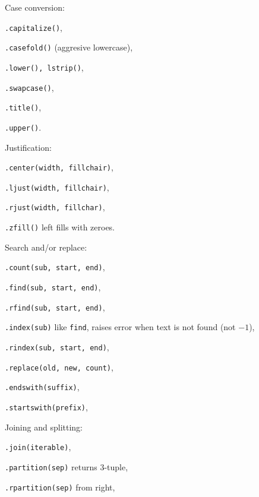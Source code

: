 \begin{compactenum}
\item Case conversion:
\begin{compactenum}
\item \texttt{.capitalize()},
\item \texttt{.casefold()} (aggresive lowercase),
\item \texttt{.lower(), lstrip()},
\item \texttt{.swapcase()},
\item \texttt{.title()},
\item \texttt{.upper()}.
\end{compactenum}
\item Justification:
\begin{compactenum}
\item \texttt{.center(width, fillchair)},
\item \texttt{.ljust(width, fillchair)},
\item \texttt{.rjust(width, fillchar)},
\item \texttt{.zfill()} left fills with zeroes.
\end{compactenum}
\item Search and/or replace:
\begin{compactenum}
\item \texttt{.count(sub, start, end)},
\item \texttt{.find(sub, start, end)},
\item \texttt{.rfind(sub, start, end)},
\item \texttt{.index(sub)} like \texttt{find}, raises error when text is not found (not $-1$),
\item \texttt{.rindex(sub, start, end)},
\item \texttt{.replace(old, new, count)},
\item \texttt{.endswith(suffix)},
\item \texttt{.startswith(prefix)},
\end{compactenum}
\item Joining and splitting:
\begin{compactenum}
\item \texttt{.join(iterable)},
\item \texttt{.partition(sep)} returns 3-tuple,
\item \texttt{.rpartition(sep)} from right,

\end{compactenum}
\end{compactenum}
